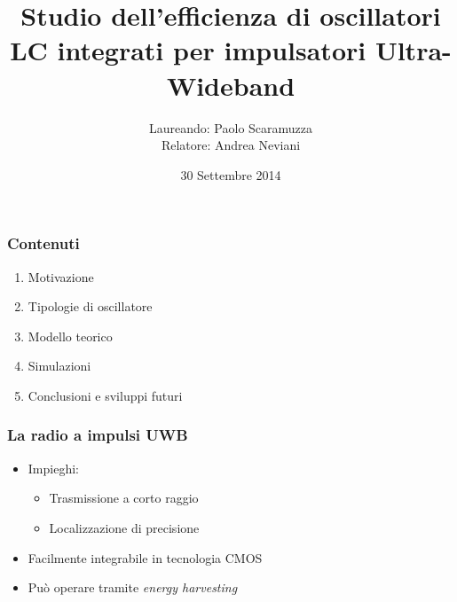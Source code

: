 \documentclass{beamer}
\title{Studio dell'efficienza di oscillatori LC integrati per impulsatori
	Ultra-Wideband}
\author{Laureando: Paolo Scaramuzza \\ Relatore: Andrea Neviani}
\date{30 Settembre 2014}
\begin{document}
%
\begin{frame}
\maketitle
\end{frame}
%
\begin{frame}
\frametitle{Contenuti}
\begin{enumerate}
	\item Motivazione
	\vfill %
	\item Tipologie di oscillatore
	\vfill
	\item Modello teorico
	\vfill
	\item Simulazioni
	\vfill
	\item Conclusioni e sviluppi futuri
	\vfill
\end{enumerate}
\end{frame}
%
\begin{frame}
\frametitle{La radio a impulsi UWB}
\begin{itemize}
	\item Impieghi:
	\begin{itemize}
		\item Trasmissione a corto raggio
		\item Localizzazione di precisione
	\end{itemize}
	\vfill
	\item Facilmente integrabile in tecnologia CMOS
	\vfill
	\item Pu\`o operare tramite \emph{energy harvesting}
	\vfill
\end{itemize}
\end{frame}
%
\end{document}
